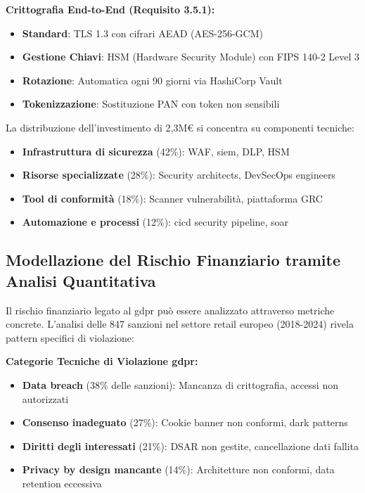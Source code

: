\textbf{Crittografia End-to-End (Requisito 3.5.1):}
\begin{itemize}
    \item \textbf{Standard}: TLS 1.3 con cifrari AEAD (AES-256-GCM)
    \item \textbf{Gestione Chiavi}: HSM (Hardware Security Module) con FIPS 140-2 Level 3
    \item \textbf{Rotazione}: Automatica ogni 90 giorni via HashiCorp Vault
    \item \textbf{Tokenizzazione}: Sostituzione PAN con token non sensibili
\end{itemize}

La distribuzione dell'investimento di 2,3M€ si concentra su componenti tecniche:
\begin{itemize}
    \item \textbf{Infrastruttura di sicurezza} (42\%): WAF, \gls{siem}, DLP, HSM
    \item \textbf{Risorse specializzate} (28\%): Security architects, DevSecOps engineers
    \item \textbf{Tool di conformità} (18\%): Scanner vulnerabilità, piattaforma GRC
    \item \textbf{Automazione e processi} (12\%): \gls{cicd} security pipeline, \gls{soar}
\end{itemize}

\subsection{Modellazione del Rischio Finanziario tramite Analisi Quantitativa}

Il rischio finanziario legato al \gls{gdpr} può essere analizzato attraverso metriche concrete\autocite{mcneil2015}. L'analisi delle 847 sanzioni nel settore retail europeo (2018-2024)\autocite{EDPB2024} rivela pattern specifici di violazione:

\textbf{Categorie Tecniche di Violazione \gls{gdpr}:}
\begin{itemize}
    \item \textbf{Data breach} (38\% delle sanzioni): Mancanza di crittografia, accessi non autorizzati
    \item \textbf{Consenso inadeguato} (27\%): Cookie banner non conformi, dark patterns
    \item \textbf{Diritti degli interessati} (21\%): DSAR non gestite, cancellazione dati fallita
    \item \textbf{Privacy by design mancante} (14\%): Architetture non conformi, data retention eccessiva
\end{itemize}

